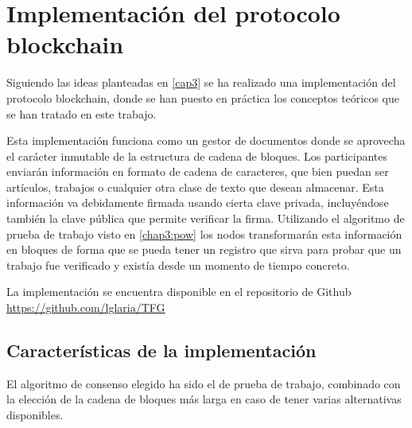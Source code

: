 \cleardoublepage

\chapter{Implementación del protocolo blockchain}
Siguiendo las ideas planteadas en \ref{cap3} se ha realizado una implementación del protocolo blockchain, donde se han puesto en práctica los conceptos teóricos que se han tratado en este trabajo. 


Esta implementación funciona como un gestor de documentos donde se aprovecha el carácter inmutable de la estructura de cadena de bloques. Los participantes enviarán información en formato de cadena de caracteres, que bien puedan ser artículos, trabajos o cualquier otra clase de texto que desean almacenar. Esta información va debidamente firmada usando cierta clave privada, incluyéndose también la clave pública que permite verificar la firma. Utilizando el algoritmo de prueba de trabajo visto en \ref{chap3:pow} los nodos transformarán esta información en bloques de forma que se pueda tener un registro que sirva para probar que un trabajo fue verificado y existía desde un momento de tiempo concreto.


La implementación se encuentra disponible en el repositorio de Github \url{https://github.com/lglaria/TFG}

\section{Características de la implementación}
El algoritmo de consenso elegido ha sido el de prueba de trabajo, combinado con la elección de la cadena de bloques más larga en caso de tener varias alternativas disponibles.

